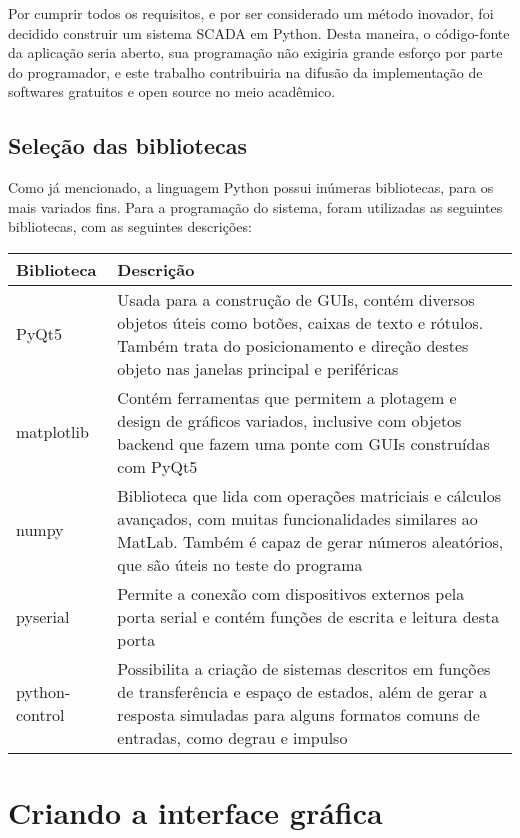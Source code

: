 Por cumprir todos os requisitos, e por ser considerado um método inovador, foi decidido construir um sistema SCADA em Python. Desta maneira, o código-fonte da aplicação seria aberto, sua programação não exigiria grande esforço por parte do programador, e este trabalho contribuiria na difusão da implementação de softwares gratuitos e open source no meio acadêmico.

\subsection{Seleção das bibliotecas}

Como já mencionado, a linguagem Python possui inúmeras bibliotecas, para os mais variados fins. Para a programação do sistema, foram utilizadas as seguintes bibliotecas, com as seguintes descrições:

\begin{center}
\begin{tabular}{|m{5em}|m{30em}|}
	\hline
	Biblioteca & Descrição \\
	\hline
	PyQt5 & Usada para a construção de GUIs, contém diversos objetos úteis como botões, caixas de texto e rótulos. Também trata do posicionamento e direção destes objeto nas janelas principal e periféricas \\
	\hline
	matplotlib & Contém ferramentas que permitem a plotagem e design de gráficos variados, inclusive com objetos backend que fazem uma ponte com GUIs construídas com PyQt5 \\
	\hline
	numpy & Biblioteca que lida com operações matriciais e cálculos avançados, com muitas funcionalidades similares ao MatLab. Também é capaz de gerar números aleatórios, que são úteis no teste do programa \\
	\hline
	pyserial & Permite a conexão com dispositivos externos pela porta serial e contém funções de escrita e leitura desta porta \\
	\hline
	python-control & Possibilita a criação de sistemas descritos em funções de transferência e espaço de estados, além de gerar a resposta simuladas para alguns formatos comuns de entradas, como degrau e impulso \\
	\hline
\end{tabular}
\end{center}

\section{Criando a interface gráfica}

